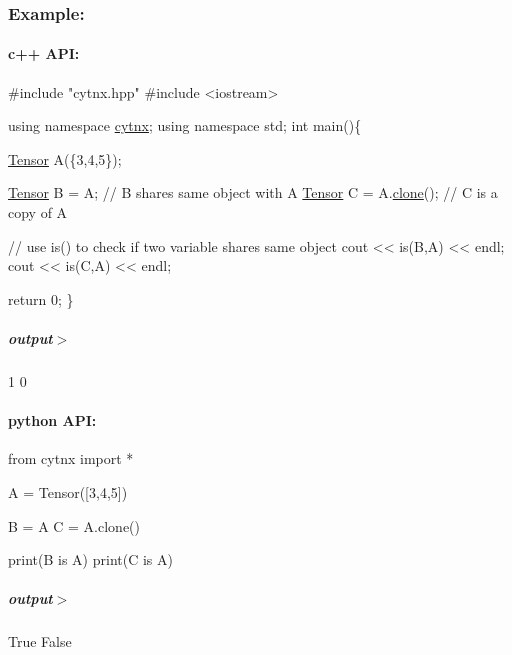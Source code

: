 \subsubsection*{Example\+:}

\paragraph*{c++ A\+PI\+:}


\begin{DoxyCodeInclude}
\textcolor{preprocessor}{#include "cytnx.hpp"}
\textcolor{preprocessor}{#include <iostream>}


\textcolor{keyword}{using namespace }\hyperlink{namespacecytnx}{cytnx};
\textcolor{keyword}{using namespace }std;
\textcolor{keywordtype}{int} main()\{ 

    \hyperlink{classcytnx_1_1Tensor}{Tensor} A(\{3,4,5\});

    \hyperlink{classcytnx_1_1Tensor}{Tensor} B = A; \textcolor{comment}{// B shares same object with A}
    \hyperlink{classcytnx_1_1Tensor}{Tensor} C = A.\hyperlink{classcytnx_1_1Tensor_a5e2248e9babdb786167ed349df9084ae}{clone}(); \textcolor{comment}{// C is a copy of A}
    
    \textcolor{comment}{// use is() to check if two variable shares same object}
    cout << is(B,A) << endl;
    cout << is(C,A) << endl;

    \textcolor{keywordflow}{return} 0;
\}

\end{DoxyCodeInclude}
 \subparagraph*{output$>$}


\begin{DoxyVerbInclude}
1
0
\end{DoxyVerbInclude}
 \paragraph*{python A\+PI\+:}


\begin{DoxyCodeInclude}
\textcolor{keyword}{from} cytnx \textcolor{keyword}{import} *

A = Tensor([3,4,5])

B = A
C = A.clone()

print(B \textcolor{keywordflow}{is} A)
print(C \textcolor{keywordflow}{is} A)

\end{DoxyCodeInclude}
 \subparagraph*{output$>$}


\begin{DoxyVerbInclude}
True
False
\end{DoxyVerbInclude}
 \mbox{\label{classcytnx_1_1Tensor_ac6d3310eb4defbdacf662dcd81d8fe09}} 
